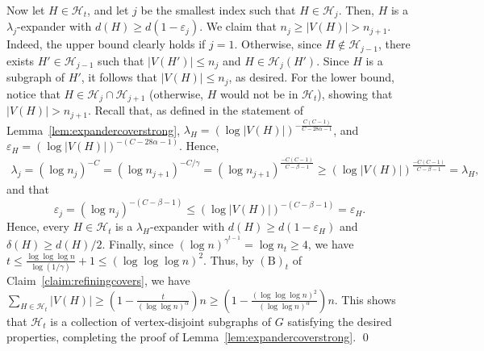 \documentclass[10pt]{article}
\theoremstyle{plain}
\numberwithin{theorem}{section}
\theoremstyle{definition}
\theoremstyle{remark}
\renewenvironment{proof}[1][]{\begin{trivlist}
\item[\hspace{\labelsep}{\bf\noindent Proof#1.\/}] }{\qed\end{trivlist}}
\newcommand{\cH}{\mathcal{H}}
\newcommand{\eps}{\varepsilon}
\theoremstyle{plain}
\begin{document}
\begin{proof}[ of Lemma~\ref{lem:expandercoverstrong}]
    Now let $H \in \cH_t$, and let $j$ be the smallest index such that $H \in \cH_j$. 
	Then, $H$ is a $\lambda_j$-expander with $d(H) \ge d(1 - \eps_j)$.
	We claim that $n_j \ge |V(H)| > n_{j+1}$. Indeed, the upper bound clearly holds if $j = 1$. Otherwise, since $H \notin \cH_{j-1}$, there exists $H' \in \cH_{j-1}$ such that $|V(H')| \le n_j$ and $H \in \cH_j(H')$. Since $H$ is a subgraph of $H'$, it follows that $|V(H)| \le n_j$, as desired.
	For the lower bound, notice that $H \in \cH_j \cap \cH_{j+1}$ (otherwise, $H$ would not be in $\cH_{t}$), showing that $|V(H)| > n_{j+1}$.
	Recall that, as defined in the statement of Lemma~\ref{lem:expandercoverstrong}, $\lambda_H = (\log |V(H)|)^{-\frac{C(C-1)}{C-28 \alpha - 1}}$, and $\eps_H = (\log |V(H)|)^{-(C-28 \alpha - 1)}$.
	Hence,
	\begin{align*}
		\lambda_j 
		= (\log n_j)^{-C} 
		= (\log n_{j+1})^{-C/\gamma} 
		= (\log n_{j+1})^{\frac{-C(C-1)}{C-\beta-1}} 
		\ge (\log |V(H)|)^{\frac{-C(C-1)}{C-\beta-1}} 
		= \lambda_H,
	\end{align*}
	and that 
	\begin{equation*}
		\eps_j = (\log n_j)^{-(C-\beta-1)} \le (\log |V(H)|)^{-(C-\beta-1)} = \eps_H.
	\end{equation*}
	Hence, every $H \in \cH_t$ is a $\lambda_H$-expander with $d(H) \ge d(1 - \eps_H)$ and $\delta(H) \ge d(H)/2$. Finally, since $(\log n)^{\gamma^{t-1}} = \log n_{t} \ge 4$, we have $t \le \frac{\log \log \log n}{\log (1/\gamma)}+1 \le (\log \log \log n)^2$. Thus, by $\mathrm{(B)}_t$ of Claim~\ref{claim:refiningcovers}, we have $\sum_{H \in \cH_{t}} |V(H)| \ge (1 - \frac{t}{(\log \log n)^{\alpha}})n \ge (1 - \frac{(\log \log \log n)^2}{(\log \log n)^{\alpha}})n.$ This shows that $\cH_t$ is a collection of vertex-disjoint subgraphs of $G$ satisfying the desired properties, completing the proof of Lemma~\ref{lem:expandercoverstrong}.
\end{proof}
\end{document}
